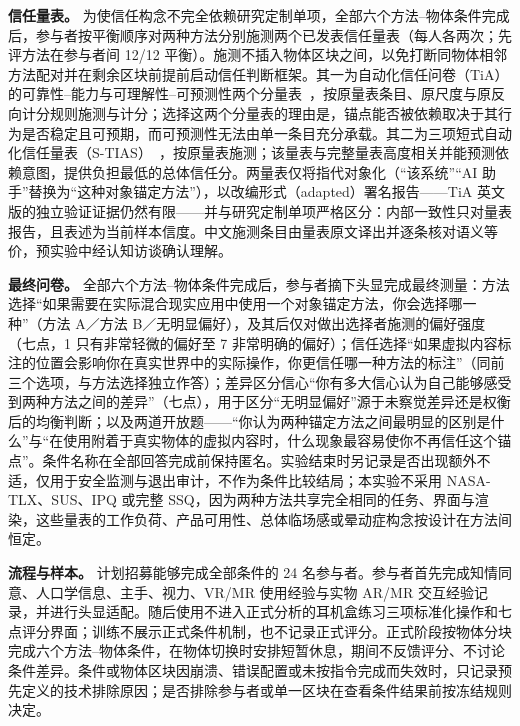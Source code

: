 \documentclass[review]{vgtc}
\begin{document}
\textbf{信任量表。} 为使信任构念不完全依赖研究定制单项，全部六个方法--物体条件完成后，参与者按平衡顺序对两种方法分别施测两个已发表信任量表（每人各两次；先评方法在参与者间 12/12 平衡）。施测不插入物体区块之间，以免打断同物体相邻方法配对并在剩余区块前提前启动信任判断框架。其一为自动化信任问卷（TiA）的可靠性--能力与可理解性--可预测性两个分量表~\cite{koerber2019tia}，按原量表条目、原尺度与原反向计分规则施测与计分；选择这两个分量表的理由是，锚点能否被依赖取决于其行为是否稳定且可预期，而可预测性无法由单一条目充分承载。其二为三项短式自动化信任量表（S-TIAS）~\cite{mcgrath2025stias}，按原量表施测；该量表与完整量表高度相关并能预测依赖意图，提供负担最低的总体信任分。两量表仅将指代对象化（“该系统”“AI 助手”替换为“这种对象锚定方法”），以改编形式（adapted）署名报告——TiA 英文版的独立验证证据仍然有限——并与研究定制单项严格区分：内部一致性只对量表报告，且表述为当前样本信度。中文施测条目由量表原文译出并逐条核对语义等价，预实验中经认知访谈确认理解。

\textbf{最终问卷。} 全部六个方法--物体条件完成后，参与者摘下头显完成最终测量：方法选择“如果需要在实际混合现实应用中使用一个对象锚定方法，你会选择哪一种”（方法 A／方法 B／无明显偏好），及其后仅对做出选择者施测的偏好强度（七点，1 只有非常轻微的偏好至 7 非常明确的偏好）；信任选择“如果虚拟内容标注的位置会影响你在真实世界中的实际操作，你更信任哪一种方法的标注”（同前三个选项，与方法选择独立作答）；差异区分信心“你有多大信心认为自己能够感受到两种方法之间的差异”（七点），用于区分“无明显偏好”源于未察觉差异还是权衡后的均衡判断；以及两道开放题——“你认为两种锚定方法之间最明显的区别是什么”与“在使用附着于真实物体的虚拟内容时，什么现象最容易使你不再信任这个锚点”。条件名称在全部回答完成前保持匿名。实验结束时另记录是否出现额外不适，仅用于安全监测与退出审计，不作为条件比较结局；本实验不采用 NASA-TLX、SUS、IPQ 或完整 SSQ，因为两种方法共享完全相同的任务、界面与渲染，这些量表的工作负荷、产品可用性、总体临场感或晕动症构念按设计在方法间恒定。

\textbf{流程与样本。} 计划招募能够完成全部条件的 24 名参与者。参与者首先完成知情同意、人口学信息、主手、视力、VR/MR 使用经验与实物 AR/MR 交互经验记录，并进行头显适配。随后使用不进入正式分析的耳机盒练习三项标准化操作和七点评分界面；训练不展示正式条件机制，也不记录正式评分。正式阶段按物体分块完成六个方法--物体条件，在物体切换时安排短暂休息，期间不反馈评分、不讨论条件差异。条件或物体区块因崩溃、错误配置或未按指令完成而失效时，只记录预先定义的技术排除原因；是否排除参与者或单一区块在查看条件结果前按冻结规则决定。
\end{document}
